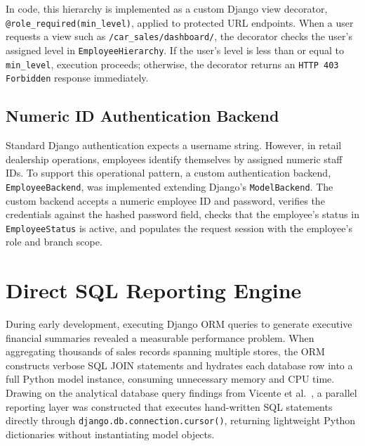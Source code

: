 In code, this hierarchy is implemented as a custom Django view decorator, \mbox{\texttt{@role\_required}}\allowbreak\texttt{(min\_level)}, applied to protected URL endpoints. When a user requests a view such as \texttt{/car\_sales/}\allowbreak\texttt{dashboard/}, the decorator checks the user's assigned level in \texttt{EmployeeHierarchy}. If the user's level is less than or equal to \texttt{min\_level}, execution proceeds; otherwise, the decorator returns an \texttt{HTTP 403 Forbidden} response immediately.

\subsection{Numeric ID Authentication Backend}

Standard Django authentication expects a username string. However, in retail dealership operations, employees identify themselves by assigned numeric staff IDs. To support this operational pattern, a custom authentication backend, \mbox{\texttt{EmployeeBackend}}, was implemented extending Django's \texttt{ModelBackend}. The custom backend accepts a numeric employee ID and password, verifies the credentials against the hashed password field, checks that the employee's status in \texttt{EmployeeStatus} is active, and populates the request session with the employee's role and branch scope.

\section{Direct SQL Reporting Engine}

During early development, executing Django ORM queries to generate executive financial summaries revealed a measurable performance problem. When aggregating thousands of sales records spanning multiple stores, the ORM constructs verbose SQL JOIN statements and hydrates each database row into a full Python model instance, consuming unnecessary memory and CPU time. Drawing on the analytical database query findings from Vicente et al.~\cite{vicente2021rdbms}, a parallel reporting layer was constructed that executes hand-written SQL statements directly through \texttt{django.db.}\allowbreak\texttt{connection.cursor()}, returning lightweight Python dictionaries without instantiating model objects.

